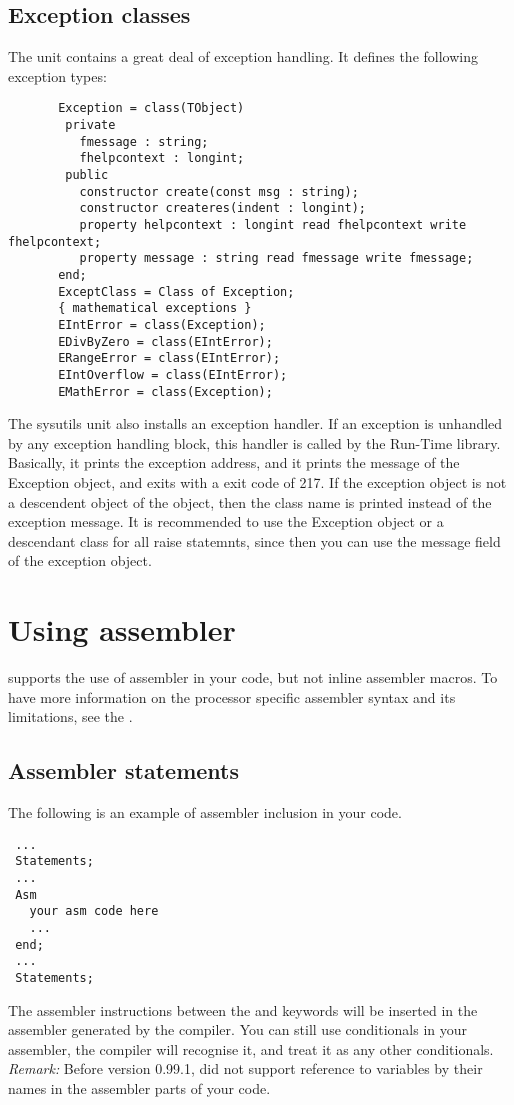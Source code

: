 \documentclass{report}
\begin{document}
\section{Exception classes}
\label{se:exceptclasses}
The  unit contains a great deal of exception handling.
It defines the following exception types:
\begin{verbatim}
       Exception = class(TObject)
        private
          fmessage : string;
          fhelpcontext : longint;
        public
          constructor create(const msg : string);
          constructor createres(indent : longint);
          property helpcontext : longint read fhelpcontext write fhelpcontext;
          property message : string read fmessage write fmessage;
       end;
       ExceptClass = Class of Exception;
       { mathematical exceptions }
       EIntError = class(Exception);
       EDivByZero = class(EIntError);
       ERangeError = class(EIntError);
       EIntOverflow = class(EIntError);
       EMathError = class(Exception);
\end{verbatim}
The sysutils unit also installs an exception handler. If an exception is
unhandled by any exception handling block, this handler is called by the
Run-Time library. Basically, it prints the exception address, and it prints
the message of the Exception object, and exits with a exit code of 217.
If the exception object is not a descendent object of the 
object, then the class name is printed instead of the exception message.
It is recommended to use the Exception object or a descendant class for
all raise statemnts, since then you can use the message field of the
exception object.
\chapter{Using assembler}
\fpc supports the use of assembler in your code, but not inline
assembler macros.  To have more information on the processor
specific assembler syntax and its limitations, see the \progref.
\section{Assembler statements }
The following is an example of assembler inclusion in your code.
\begin{verbatim}
 ...
 Statements;
 ...
 Asm
   your asm code here
   ...
 end;
 ...
 Statements;
\end{verbatim}
The assembler instructions between the  and  keywords will
be inserted in the assembler generated by the compiler.
You can still use conditionals in your assembler, the compiler will
recognise it, and treat it as any other conditionals.
\emph{ Remark: } Before version 0.99.1, \fpc did not support
reference to variables by their names in the assembler parts of your code.
\end{document}
